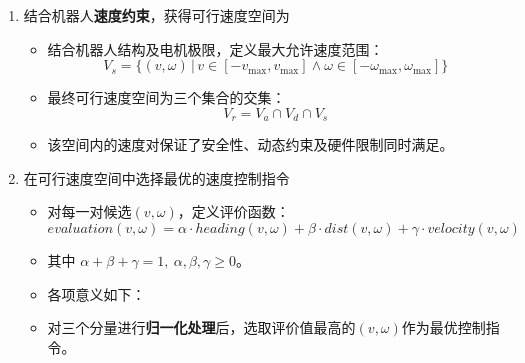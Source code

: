 \documentclass[../main.tex]{subfiles}
\begin{document}
\begin{enumerate}
\begin{itemize}
\begin{enumerate}
                    \item 结合机器人\textbf{速度约束}，获得可行速度空间为
                        \begin{itemize}
                            \item {\small\kaishu 结合机器人结构及电机极限，定义最大允许速度范围：}
                            \[
                            V_s = \{(v,\omega)\,|\,v \in [-v_{\max},v_{\max}] \wedge \omega \in [-\omega_{\max},\omega_{\max}]\}
                            \]
                            \item {\small\kaishu 最终可行速度空间为三个集合的交集：}
                            \[
                            V_r = V_a \cap V_d \cap V_s
                            \]
                            \item {\small\kaishu 该空间内的速度对保证了安全性、动态约束及硬件限制同时满足。}
                        \end{itemize}
                
                    \item 在可行速度空间中选择最优的速度控制指令
                        \begin{itemize}
                            \item {\small\kaishu 对每一对候选$(v,\omega)$，定义评价函数：}
                            \[
                            evaluation(v,\omega) = \alpha \cdot heading(v,\omega) + \beta \cdot dist(v,\omega) + \gamma \cdot velocity(v,\omega)
                            \]
                            \item {\small\kaishu 其中 $\alpha + \beta + \gamma = 1, \ \alpha,\beta,\gamma \ge 0$。}
                            \item {\small\kaishu 各项意义如下：}
                            \item {\small\kaishu 对三个分量进行\textbf{归一化处理}后，选取评价值最高的$(v,\omega)$作为最优控制指令。}
                        \end{itemize}
                \end{enumerate}


\end{itemize}
\end{enumerate}
\end{document}

